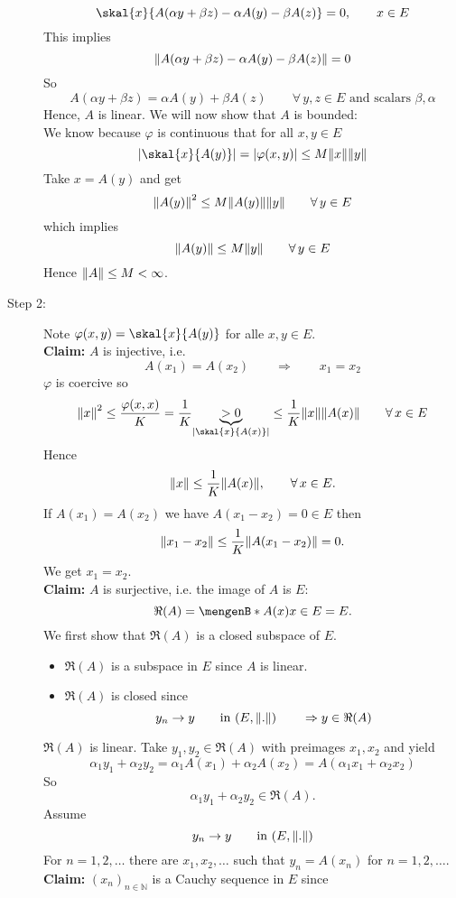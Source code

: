\begin{beweis}
\begin{description}
		\[
			\skal{x}{A(\alpha y + \beta z)- \alpha A(y) - \beta A(z)} = 0, \qquad  x \in E
		\]
		This implies 
		\[
			\norm{A(\alpha y + \beta z) - \alpha A(y) - \beta A(z)} = 0
		\]
		So \[
			A( \alpha y+ \beta z) = \alpha A(y) + \beta A(z) \qquad \forall\, y,z \in E \text{ and scalars }\beta,\alpha
		\]
		Hence, $A$ is linear. We will now show that $A$ is bounded: \\
		We know because $\varphi$ is continuous that for all $x,y \in E$
		\[
			\abs{\skal{x}{A(y)}} = \abs{\varphi(x,y)} \leq M \norm{x} \norm{y}
		\]
		Take $x = A(y)$ and get
		\[
			\norm{A(y)}^2 \leq  M \norm{A(y)} \norm{y} \qquad \forall\, y \in E
		\]
		which implies
		\[
			\norm{A(y)} \leq M \norm{y} \qquad \forall\, y \in E
		\]
		Hence $\norm{A} \leq M < \infty$.
		\item[Step 2:] Note $\varphi(x,y) = \skal{x}{A(y)}$ for alle $x,y \in E$. \\
		\textbf{Claim:} \text{    }$A$ is injective, i.e.
		\[
			A(x_1) = A(x_2) \qquad \Rightarrow \qquad x_1 = x_2
 		\]
		$\varphi$ is coercive so
		\[
			\norm{x}^2 \leq \frac{\varphi(x,x)}{K} = \frac{1}{K} \underset{\abs{\skal{x}{A(x)}}}{\underbrace{>0}} \leq \frac{1}{K} \norm{x} \norm{A(x)} \qquad \forall\,  x \in E
		\]
		Hence \[
			\norm{x} \leq  \frac{1}{K} \norm{A(x)}, \qquad \forall\, x \in E.
		\]
		If $A(x_1) = A(x_2)$ we have $A(x_1-x_2) = 0 \in E$ then
		\[
			\norm{x_1 - x_2} \leq \frac{1}{K} \norm{A(x_1 -x_2)} = 0.
		\]
		We get $x_1 = x_2$. \\
		\textbf{Claim:} \text{    }$A$ is surjective, i.e. the image of $A$ is $E$: \[
			\Re(A) = \set[A(x)]{x \in E} = E.
		\] 
		We first show that $\Re(A)$ is a closed subspace of $E$. 
		\begin{itemize}
			\item $\Re(A)$ is a subspace in $E$ since $A$ is linear.
			\item $\Re(A)$ is closed since
			\[
				y_n \to y \qquad \text{in }(E, \norm{.}) \qquad \Rightarrow y \in \Re(A)
			\]			
		\end{itemize}
		$\Re(A)$ is linear. Take $y_1,y_2 \in \Re(A)$ with preimages $x_1,x_2$ and yield
		\[
			\alpha_1 y_1 + \alpha_2 y_2 = \alpha_1 A(x_1) + \alpha_2 A(x_2) = A(\alpha_1 x_1 + \alpha_2 x_2)
		\]
		So \[
			\alpha_1 y_1 + \alpha_2 y_2 \in \Re(A).
		\]
		Assume \[
			y_n \to y \qquad \text{in }(E, \norm{.})
		\]
		For $n=1,2,\dots$ there are $x_1,x_2,\dots$ such that $y_n= A(x_n)$ for $n=1,2,\dots$. \\
		\textbf{Claim:} \text{    }$(x_n)_{n \in \mathbb{N}}$ is a Cauchy sequence in $E$ since

\end{description}
\end{beweis}
